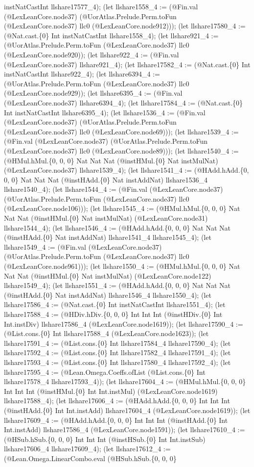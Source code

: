 \documentclass[11pt]{article}
\begin{document}
instNatCastInt llshare17577\_4); (let llshare1558\_4 := (@Fin.val (@LexLeanCore.node37) (@UorAtlas.Prelude.Perm.toFun (@LexLeanCore.node37) llc0 (@LexLeanCore.node912))); (let llshare17580\_4 := (@Nat.cast.\{0\} Int instNatCastInt llshare1558\_4); (let llshare921\_4 := (@UorAtlas.Prelude.Perm.toFun (@LexLeanCore.node37) llc0 (@LexLeanCore.node920)); (let llshare922\_4 := (@Fin.val (@LexLeanCore.node37) llshare921\_4); (let llshare17582\_4 := (@Nat.cast.\{0\} Int instNatCastInt llshare922\_4); (let llshare6394\_4 := (@UorAtlas.Prelude.Perm.toFun (@LexLeanCore.node37) llc0 (@LexLeanCore.node929)); (let llshare6395\_4 := (@Fin.val (@LexLeanCore.node37) llshare6394\_4); (let llshare17584\_4 := (@Nat.cast.\{0\} Int instNatCastInt llshare6395\_4); (let llshare1536\_4 := (@Fin.val (@LexLeanCore.node37) (@UorAtlas.Prelude.Perm.toFun (@LexLeanCore.node37) llc0 (@LexLeanCore.node69))); (let llshare1539\_4 := (@Fin.val (@LexLeanCore.node37) (@UorAtlas.Prelude.Perm.toFun (@LexLeanCore.node37) llc0 (@LexLeanCore.node89))); (let llshare1540\_4 := (@HMul.hMul.\{0, 0, 0\} Nat Nat Nat (@instHMul.\{0\} Nat instMulNat) (@LexLeanCore.node37) llshare1539\_4); (let llshare1541\_4 := (@HAdd.hAdd.\{0, 0, 0\} Nat Nat Nat (@instHAdd.\{0\} Nat instAddNat) llshare1536\_4 llshare1540\_4); (let llshare1544\_4 := (@Fin.val (@LexLeanCore.node37) (@UorAtlas.Prelude.Perm.toFun (@LexLeanCore.node37) llc0 (@LexLeanCore.node106))); (let llshare1545\_4 := (@HMul.hMul.\{0, 0, 0\} Nat Nat Nat (@instHMul.\{0\} Nat instMulNat) (@LexLeanCore.node31) llshare1544\_4); (let llshare1546\_4 := (@HAdd.hAdd.\{0, 0, 0\} Nat Nat Nat (@instHAdd.\{0\} Nat instAddNat) llshare1541\_4 llshare1545\_4); (let llshare1549\_4 := (@Fin.val (@LexLeanCore.node37) (@UorAtlas.Prelude.Perm.toFun (@LexLeanCore.node37) llc0 (@LexLeanCore.node961))); (let llshare1550\_4 := (@HMul.hMul.\{0, 0, 0\} Nat Nat Nat (@instHMul.\{0\} Nat instMulNat) (@LexLeanCore.node122) llshare1549\_4); (let llshare1551\_4 := (@HAdd.hAdd.\{0, 0, 0\} Nat Nat Nat (@instHAdd.\{0\} Nat instAddNat) llshare1546\_4 llshare1550\_4); (let llshare17586\_4 := (@Nat.cast.\{0\} Int instNatCastInt llshare1551\_4); (let llshare17588\_4 := (@HDiv.hDiv.\{0, 0, 0\} Int Int Int (@instHDiv.\{0\} Int Int.instDiv) llshare17586\_4 (@LexLeanCore.node1619)); (let llshare17590\_4 := (@List.cons.\{0\} Int llshare17588\_4 (@LexLeanCore.node1623)); (let llshare17591\_4 := (@List.cons.\{0\} Int llshare17584\_4 llshare17590\_4); (let llshare17592\_4 := (@List.cons.\{0\} Int llshare17582\_4 llshare17591\_4); (let llshare17593\_4 := (@List.cons.\{0\} Int llshare17580\_4 llshare17592\_4); (let llshare17595\_4 := (@Lean.Omega.Coeffs.ofList (@List.cons.\{0\} Int llshare17578\_4 llshare17593\_4)); (let llshare17604\_4 := (@HMul.hMul.\{0, 0, 0\} Int Int Int (@instHMul.\{0\} Int Int.instMul) (@LexLeanCore.node1619) llshare17588\_4); (let llshare17606\_4 := (@HAdd.hAdd.\{0, 0, 0\} Int Int Int (@instHAdd.\{0\} Int Int.instAdd) llshare17604\_4 (@LexLeanCore.node1619)); (let llshare17609\_4 := (@HAdd.hAdd.\{0, 0, 0\} Int Int Int (@instHAdd.\{0\} Int Int.instAdd) llshare17586\_4 (@LexLeanCore.node1591)); (let llshare17610\_4 := (@HSub.hSub.\{0, 0, 0\} Int Int Int (@instHSub.\{0\} Int Int.instSub) llshare17606\_4 llshare17609\_4); (let llshare17612\_4 := (@Lean.Omega.LinearCombo.eval (@HSub.hSub.\{0, 0, 0\} 
\end{document}
